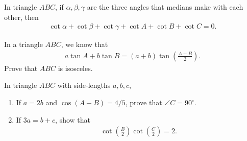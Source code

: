 \begin{question}
    In triangle $ABC$, if $\alpha,\beta,\gamma$ are the three angles that medians make with each other, then
    \begin{align*}
        \cot\alpha + \cot\beta + \cot\gamma + \cot A + \cot B + \cot C = 0.
    \end{align*}
\end{question}

\begin{question}
    In a triangle $ABC$, we know that
    \begin{align*}
        a\tan A + b\tan B = (a+b)\tan\left(\frac{A+B}{2}\right).
    \end{align*}
    Prove that $ABC$ is isosceles.
\end{question}

\begin{question}
    In triangle $ABC$ with side-lengths $a,b,c$,
    \begin{enumerate}
        \item If $a=2b$ and $\cos(A-B)=4/5$, prove that $\angle C=90^\circ$.
        \item If $3a=b+c$, show that
    \begin{align*}
        \cot\left(\frac{B}{2}\right)\cot\left(\frac{C}{2}\right)=2.
    \end{align*}
    \end{enumerate}
\end{question}

